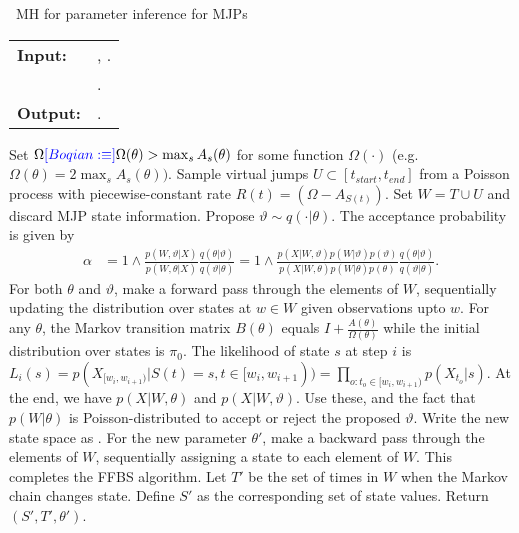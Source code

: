 \begin{algorithm}[H]
   \caption{\Naive\  MH for parameter inference for MJPs }
   \label{alg:MH_naive}
  \begin{tabular}{l l}
   \textbf{Input:  } & \text{Observations $X$}, 
                       \text{the previous MJP path $S(t) = (S, T)$ and parameters $\theta$ \boqian{and  $\pi_0$}}.\\ 
                     & \text{A  Metropolis-Hasting proposal $q(\cdot | \theta)$}.\\
   \textbf{Output:  }& \text{A new MJP trajectory $S'(t) = (S', T')$, 
                            new MJP parameters $\theta'$}.\\
   \hline
   \end{tabular}
   \begin{algorithmic}[1]
     \State Set $\Omega \textcolor{blue}{[Boqian: \equiv]} \Omega(\theta) > \max_s{A_s(\theta)}$ for
     some function $\Omega(\cdot)$ (e.g.\ $\Omega(\theta) = 
      2\max_s A_s(\theta))$.
      \State Sample virtual jumps $U\subset[t_{start}, t_{end}]$  from a 
      Poisson process with piecewise-constant rate 
      $R(t) = (\Omega - A_{S(t)})$. 
    Set $W = T \cup U$ and discard MJP state information.
      \State Propose $\vartheta \sim q(\cdot| \theta)$.
          The acceptance probability is given by 
          \begin{align*}
          \alpha &=  1 \wedge \frac{p(W,\vartheta| X)}{p(W, \theta| X)} \frac{q(\theta|\vartheta)}{q(\vartheta|\theta)}
          =  1 \wedge \frac{p(X| W,\vartheta) p(W | \vartheta)p(\vartheta)}{p(X|W, \theta)p(W | \theta)p(\theta)} \frac{q(\theta|\vartheta)}{q(\vartheta|\theta)}.
          \end{align*}
    \State For both $\theta$ and $\vartheta$, make a forward pass through the 
    elements of $W$, sequentially updating the distribution over states at 
    $w \in W$ given observations upto $w$. 
    For any $\theta$, the Markov transition matrix 
    $B(\theta)$ equals $I + \frac{A(\theta)}{\Omega(\theta)}$ while the initial distribution
      over states is $\pi_0$. The likelihood of state $s$ at step $i$ is 
      $ L_i(s) = p(X_{[w_i, w_{i + 1})} | S(t) = s , t \in [w_i, w_{i + 1})) = 
      \prod_{o: t_o \in [w_i, w_{i + 1})}p(X_{t_o} | s)$.
    At the end, we have 
    $p(X|W,\theta)$ and $p(X|W,\vartheta)$. Use these, and the fact that 
    $p(W|\theta)$ is Poisson-distributed to accept or reject the
    proposed $\vartheta$. Write the new state space
    as .
    \State For the new parameter $\theta'$, make a backward pass through 
    the elements of
    $W$, sequentially assigning a state to each element of $W$. This
    completes the FFBS algorithm.
    \State Let $T'$ be the set of times in $W$ when the Markov chain changes state. Define $S'$ as the corresponding set of state values. Return $(S', T', \theta')$.
\end{algorithmic}
\end{algorithm}
